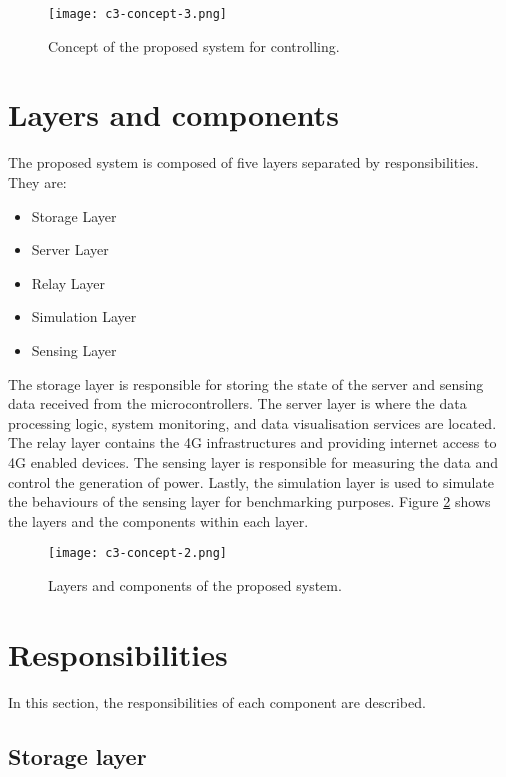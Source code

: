 \documentclass[../thesis.tex]{subfiles}
\begin{document}
\begin{figure}[!ht]
  \texttt{[image: c3-concept-3.png]}
  \caption{Concept of the proposed system for controlling.}
  \label{fig:concept3}
\end{figure}


\newpage
\section{Layers and components}
\label{sec:layers}

The proposed system is composed of five layers separated by responsibilities. They are:

\begin{itemize}
	\item Storage Layer
	\item Server Layer
	\item Relay Layer
	\item Simulation Layer
	\item Sensing Layer
\end{itemize}

The storage layer is responsible for storing the state of the server and sensing data received from the microcontrollers. The server layer is where the data processing logic, system monitoring, and data visualisation services are located. The relay layer contains the 4G infrastructures and providing internet access to 4G enabled devices. The sensing layer is responsible for measuring the data and control the generation of power. Lastly, the simulation layer is used to simulate the behaviours of the sensing layer for benchmarking purposes. Figure \ref{fig:concept2} shows the layers and the components within each layer.


\begin{figure}[!ht]
  \texttt{[image: c3-concept-2.png]}
  \caption{Layers and components of the proposed system.}
  \label{fig:concept2}
\end{figure}

\section{Responsibilities}
\label{sec:responsibilities}

In this section, the responsibilities of each component are described. 

\subsection{Storage layer}
\end{document}
